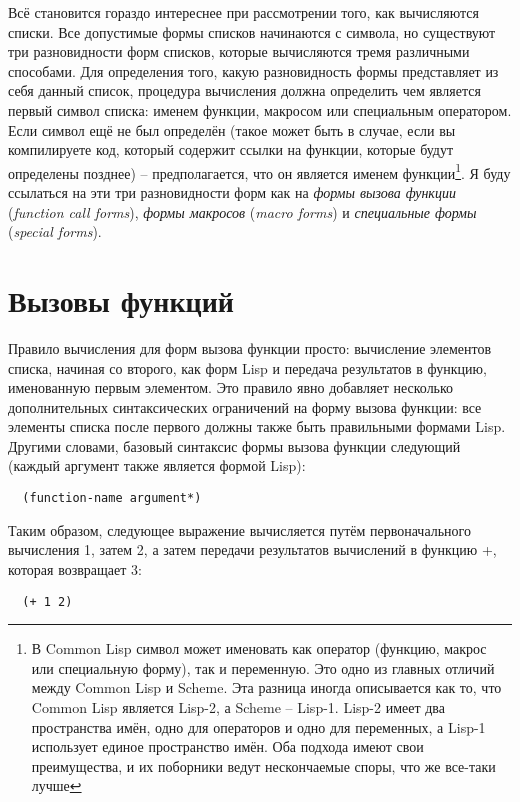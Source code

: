 Всё становится гораздо интереснее при рассмотрении того, как вычисляются списки. Все
допустимые формы списков начинаются с символа, но существуют три разновидности форм
списков, которые вычисляются тремя различными способами. Для определения того, какую
разновидность формы представляет из себя данный список, процедура вычисления должна
определить чем является первый символ списка: именем функции, макросом или специальным
оператором. Если символ ещё не был определён (такое может быть в случае, если вы
компилируете код, который содержит ссылки на функции, которые будут определены позднее) --
предполагается, что он является именем функции\footnote{В Common Lisp символ может
  именовать как оператор (функцию, макрос или специальную форму), так и переменную. Это
  одно из главных отличий между Common Lisp и Scheme. Эта разница иногда описывается как
  то, что Common Lisp является Lisp-2, а Scheme -- Lisp-1. Lisp-2 имеет два пространства
  имён, одно для операторов и одно для переменных, а Lisp-1 использует единое пространство
  имён. Оба подхода имеют свои преимущества, и их поборники ведут нескончаемые споры, что
  же все-таки лучше}. Я буду ссылаться на эти три разновидности форм как на \textit{формы
  вызова функции} (\textit{function call forms}), \textit{формы макросов} (\textit{macro
  forms}) и \textit{специальные формы} (\textit{special forms}).

\section{Вызовы функций}

Правило вычисления для форм вызова функции просто: вычисление элементов списка, начиная со
второго, как форм Lisp и передача результатов в функцию, именованную первым элементом. Это
правило явно добавляет несколько дополнительных синтаксических ограничений на форму вызова
функции: все элементы списка после первого должны также быть правильными формами
Lisp. Другими словами, базовый синтаксис формы вызова функции следующий (каждый аргумент
также является формой Lisp):

\begin{verbatim}
  (function-name argument*)
\end{verbatim}

Таким образом, следующее выражение вычисляется путём первоначального вычисления 1, затем
2, а затем передачи результатов вычислений в функцию +, которая возвращает 3:

\begin{lstlisting}
  (+ 1 2)
\end{lstlisting}

